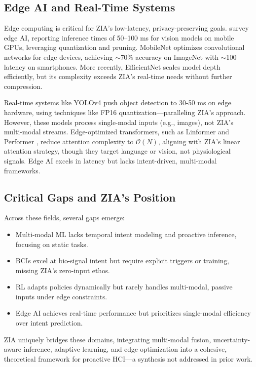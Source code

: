 \subsection{Edge AI and Real-Time Systems}
Edge computing is critical for ZIA's low-latency, privacy-preserving goals. \cite{chen2019deep} survey edge AI, reporting inference times of 50–100 ms for vision models on mobile GPUs, leveraging quantization and pruning. MobileNet \cite{howard2017mobilenets} optimizes convolutional networks for edge devices, achieving $\sim$70\% accuracy on ImageNet with $\sim$100\, latency on smartphones. More recently, EfficientNet \cite{tan2019efficientnet} scales model depth efficiently, but its complexity exceeds ZIA's real-time needs without further compression.



Real-time systems like YOLOv4 \cite{bochkovskiy2020yolov4} push object detection to 30-50 ms on edge hardware, using techniques like FP16 quantization—paralleling ZIA's approach. However, these models process single-modal inputs (e.g., images), not ZIA's multi-modal streams. Edge-optimized transformers, such as Linformer \cite{wang2020linformer} and Performer \cite{choromanski2020rethinking}, reduce attention complexity to \(\mathcal{O}(N)\), aligning with ZIA's linear attention strategy, though they target language or vision, not physiological signals. Edge AI excels in latency but lacks intent-driven, multi-modal frameworks.

\subsection{Critical Gaps and ZIA's Position}
Across these fields, several gaps emerge:
\begin{itemize}
    \item Multi-modal ML lacks temporal intent modeling and proactive inference, focusing on static tasks.
    \item BCIs excel at bio-signal intent but require explicit triggers or training, missing ZIA's zero-input ethos.
    \item RL adapts policies dynamically but rarely handles multi-modal, passive inputs under edge constraints.
    \item Edge AI achieves real-time performance but prioritizes single-modal efficiency over intent prediction.
\end{itemize}

ZIA uniquely bridges these domains, integrating multi-modal fusion, uncertainty-aware inference, adaptive learning, and edge optimization into a cohesive, theoretical framework for proactive HCI—a synthesis not addressed in prior work.